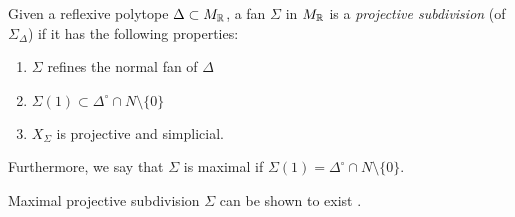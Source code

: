 \documentclass[../main.tex]{subfiles}
\begin{document}
\begin{defn}
    Given a reflexive polytope $\Delta \subset M_{\mathbb{R}}$, a fan $\Sigma$ in $M_{\mathbb{R}}$ is a \emph{projective subdivision} (of $\Sigma_\Delta$) if it has the following properties:
    \begin{enumerate}
        \item $\Sigma$ refines the normal fan of $\Delta$
        \item  $\Sigma(1) \subset \Delta^\circ \cap N \setminus \{ 0 \} $ 
        \item $X_\Sigma$ is projective and simplicial.
    \end{enumerate}
    Furthermore, we say that $\Sigma$ is maximal if  $\Sigma(1) = \Delta^\circ \cap N \setminus \{ 0 \} $.    
\end{defn}

Maximal projective subdivision $\Sigma$ can be shown to exist \cite{OdP91}.
\end{document}

